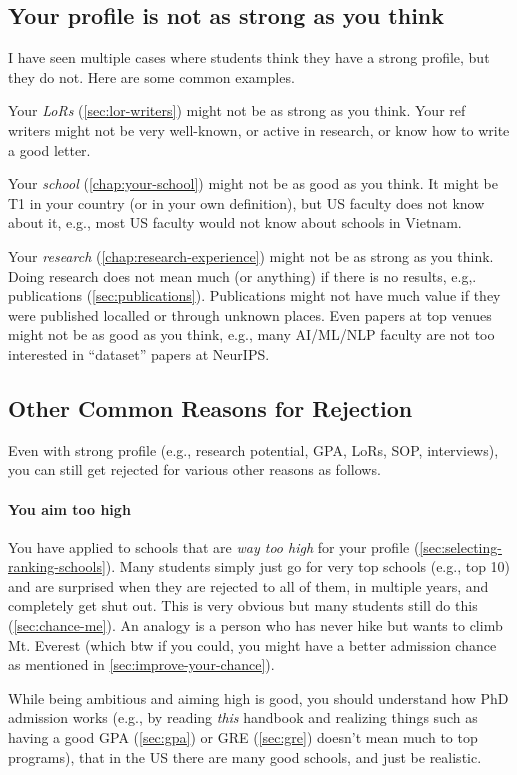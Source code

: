 \documentclass[oneside,11pt,dvipsnames]{book}
\begin{document}
\subsection{Your profile is not as strong as you think}  
I have seen multiple cases where students think they have a strong profile, but they do not. Here are some common examples.

Your \emph{LoRs} (\autoref{sec:lor-writers}) might not be as strong as you think. Your ref writers might not be very well-known, or active in research, or know how to write a good letter. 

Your \emph{school} (\autoref{chap:your-school}) might not be as good as you think.  It might be T1 in your country (or in your own definition), but US faculty does not know about it, e.g., most US faculty would not know about schools in Vietnam.  

Your \emph{research} (\autoref{chap:research-experience}) might not be as strong as you think.  Doing research does not mean much (or anything) if there is no results, e.g,. publications (\autoref{sec:publications}). Publications might not have much value if they were published localled or through unknown places.  Even papers at top venues might not be as good as you think, e.g., many AI/ML/NLP faculty are not too interested in ``dataset'' papers at NeurIPS.

\subsection{Other Common Reasons for Rejection}
Even with strong profile (e.g., research potential, GPA, LoRs, SOP, interviews), you can still get rejected for various other reasons as follows. 

\paragraph{You aim too high} 
You have applied to schools that are \emph{way too high} for your profile (\autoref{sec:selecting-ranking-schools}). Many students simply just go for very top schools (e.g., top 10) and are surprised when they are rejected to all of them, in multiple years, and completely get shut out.  This is very obvious but many students still do this (\autoref{sec:chance-me}). An analogy is a person who has never hike but wants to climb Mt. Everest (which btw if you could, you might have a better admission chance as mentioned in \autoref{sec:improve-your-chance}).

While being ambitious and aiming high is good, you should understand how PhD admission works (e.g., by reading \emph{this} handbook and realizing things such as having a good GPA (\autoref{sec:gpa}) or GRE (\autoref{sec:gre}) doesn't mean much to top programs), that in the US there are many good schools, and just be realistic. 
\end{document}

